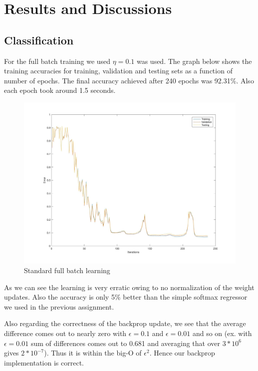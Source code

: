\documentclass[11pt,twoside]{article}
\begin{document}
\section{Results and Discussions}

\subsection{Classification}

For the full batch training we used $\eta = 0.1$ was used. The graph below shows the training accuracies for training, validation and testing sets as a function of number of epochs. The final accuracy achieved after 240 epochs was 92.31\%. Also each epoch took around 1.5 seconds.

  \begin{figure}[H]
  \includegraphics[width=1\textwidth]{full_batch}
  \centering
  \caption{Standard full batch learning}
  \label{fig:3_1}
  \end{figure}

As we can see the learning is very erratic owing to no normalization of the weight updates. Also the accuracy is only 5\% better than the simple softmax regressor we used in the previous assignment.

Also regarding the correctness of the backprop update, we see that the average difference comes out to nearly zero with $\epsilon=0.1$ and $\epsilon=0.01$ and so on (ex. with $\epsilon=0.01$ sum of differences comes out to 0.681 and averaging that over $3*10^{6}$ gives $2*10^{-7}$). Thus it is within the big-O of $\epsilon^{2}$. Hence our backprop implementation is correct.
\end{document}
